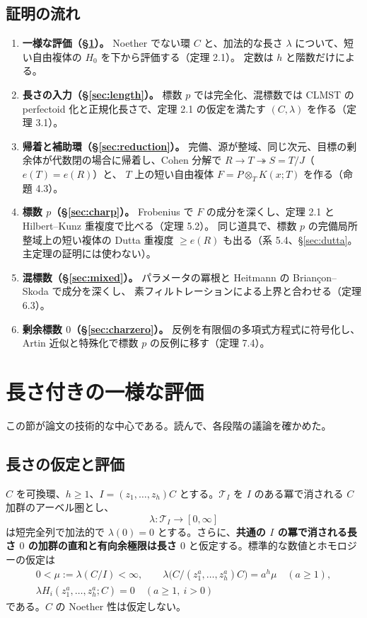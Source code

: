 \documentclass[11pt,a4paper]{ltjsarticle}
\theoremstyle{plain}
\theoremstyle{definition}
\newcommand{\cT}{\mathcal{T}}
\begin{document}
\subsection{証明の流れ}
\begin{enumerate}
  \item \textbf{一様な評価（\S\ref{sec:estimate}）。}
  Noether でない環 $C$ と、加法的な長さ $\lambda$ について、短い自由複体の $H_0$ を下から評価する（定理 2.1）。
  定数は $h$ と階数だけによる。
  \item \textbf{長さの入力（\S\ref{sec:length}）。}
  標数 $p$ では完全化、混標数では CLMST の perfectoid 化と正規化長さで、定理 2.1 の仮定を満たす $(C,\lambda)$ を作る（定理 3.1）。
  \item \textbf{帰着と補助環（\S\ref{sec:reduction}）。}
  完備、源が整域、同じ次元、目標の剰余体が代数閉の場合に帰着し、Cohen 分解で $R\to T\twoheadrightarrow S = T/J$（$e(T) = e(R)$）と、
  $T$ 上の短い自由複体 $F = P\otimes_TK(x;T)$ を作る（命題 4.3）。
  \item \textbf{標数 $p$（\S\ref{sec:charp}）。} Frobenius で $F$ の成分を深くし、定理 2.1 と Hilbert--Kunz 重複度で比べる（定理 5.2）。
  同じ道具で、標数 $p$ の完備局所整域上の短い複体の Dutta 重複度 $\ge e(R)$ も出る（系 5.4、\S\ref{sec:dutta}。主定理の証明には使わない）。
  \item \textbf{混標数（\S\ref{sec:mixed}）。} パラメータの冪根と Heitmann の Briançon--Skoda で成分を深くし、
  素フィルトレーションによる上界と合わせる（定理 6.3）。
  \item \textbf{剰余標数 $0$（\S\ref{sec:charzero}）。} 反例を有限個の多項式方程式に符号化し、Artin 近似と特殊化で標数 $p$ の反例に移す（定理 7.4）。
\end{enumerate}

\section{長さ付きの一様な評価}\label{sec:estimate}

この節が論文の技術的な中心である。読んで、各段階の議論を確かめた。

\subsection{長さの仮定と評価}
$C$ を可換環、$h\ge1$、$I = (z_1,\dots,z_h)C$ とする。$\cT_I$ を $I$ のある冪で消される $C$ 加群のアーベル圏とし、
\[
  \lambda\colon\cT_I\longrightarrow[0,\infty]
\]
は短完全列で加法的で $\lambda(0)=0$ とする。さらに、\textbf{共通の $I$ の冪で消される長さ $0$ の加群の直和と有向余極限は長さ $0$} と仮定する。標準的な数値とホモロジーの仮定は
\begin{equation}\tag{2.1}
  \begin{gathered}
  0<\mu := \lambda(C/I)<\infty,\qquad
  \lambda\bigl(C/(z_1^a,\dots,z_h^a)C\bigr) = a^h\mu\quad(a\ge1),\\
  \lambda H_i(z_1^a,\dots,z_h^a;C) = 0\quad(a\ge1,\ i>0)
  \end{gathered}
\end{equation}
である。$C$ の Noether 性は仮定しない。
\end{document}
